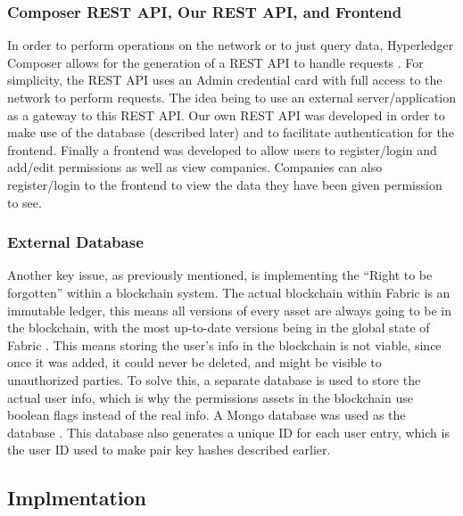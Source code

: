 \documentclass[11pt,journal]{IEEEtran}
\begin{document}
\subsubsection{Composer REST API, Our REST API, and Frontend}

In order to perform operations on the network or to just query data, Hyperledger Composer allows for the generation of a REST API to handle requests \cite{Composer:online}. For simplicity, the REST API uses an Admin credential card with full access to the network to perform requests. The idea being to use an external server/application as a gateway to this REST API. Our own REST API was developed in order to make use of the database (described later) and to facilitate authentication for the frontend. Finally a frontend was developed to allow users to register/login and add/edit permissions as well as view companies. Companies can also register/login to the frontend to view the data they have been given permission to see.

\subsubsection{External Database}

Another key issue, as previously mentioned, is implementing the “Right to be forgotten” within a blockchain system. The actual blockchain within Fabric is an immutable ledger, this means all versions of every asset are always going to be in the blockchain, with the most up-to-date versions being in the global state of Fabric \cite{WhyHyper54:online}. This means storing the user's info in the blockchain is not viable, since once it was added, it could never be deleted, and might be visible to unauthorized parties. To solve this, a separate database is used to store the actual user info, which is why the permissions assets in the blockchain use boolean flags instead of the real info. A Mongo database was used as the database \cite{Mongo:online}. This database also generates a unique ID for each user entry, which is the user ID used to make pair key hashes described earlier. 

\subsection{Implmentation} \label{sec:implement}
\end{document}
